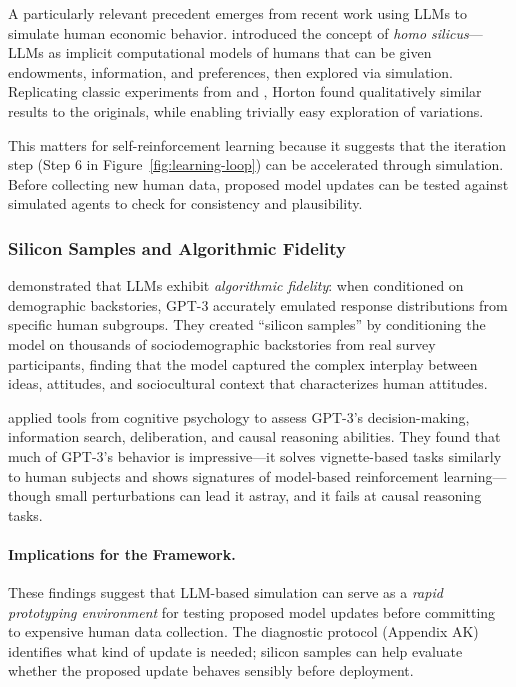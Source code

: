 A particularly relevant precedent emerges from recent work using LLMs to 
simulate human economic behavior. \citet{horton2023} introduced the concept 
of \emph{homo silicus}---LLMs as implicit computational models of humans that 
can be given endowments, information, and preferences, then explored via 
simulation. Replicating classic experiments from \citet{charness2002} and 
\citet{kahneman1986}, Horton found qualitatively similar results to the 
originals, while enabling trivially easy exploration of variations.

This matters for self-reinforcement learning because it suggests that the 
iteration step (Step 6 in Figure~\ref{fig:learning-loop}) can be accelerated 
through simulation. Before collecting new human data, proposed model updates 
can be tested against simulated agents to check for consistency and 
plausibility.

\subsubsection{Silicon Samples and Algorithmic Fidelity}

\citet{argyle2023} demonstrated that LLMs exhibit \emph{algorithmic fidelity}: 
when conditioned on demographic backstories, GPT-3 accurately emulated response 
distributions from specific human subgroups. They created ``silicon samples'' 
by conditioning the model on thousands of sociodemographic backstories from 
real survey participants, finding that the model captured the complex interplay 
between ideas, attitudes, and sociocultural context that characterizes human 
attitudes.

\citet{binz2023} applied tools from cognitive psychology to assess GPT-3's 
decision-making, information search, deliberation, and causal reasoning 
abilities. They found that much of GPT-3's behavior is impressive---it solves 
vignette-based tasks similarly to human subjects and shows signatures of 
model-based reinforcement learning---though small perturbations can lead it 
astray, and it fails at causal reasoning tasks.

\paragraph{Implications for the Framework.}
These findings suggest that LLM-based simulation can serve as a \emph{rapid 
prototyping environment} for testing proposed model updates before committing 
to expensive human data collection. The diagnostic protocol (Appendix AK) 
identifies what kind of update is needed; silicon samples can help evaluate 
whether the proposed update behaves sensibly before deployment.

